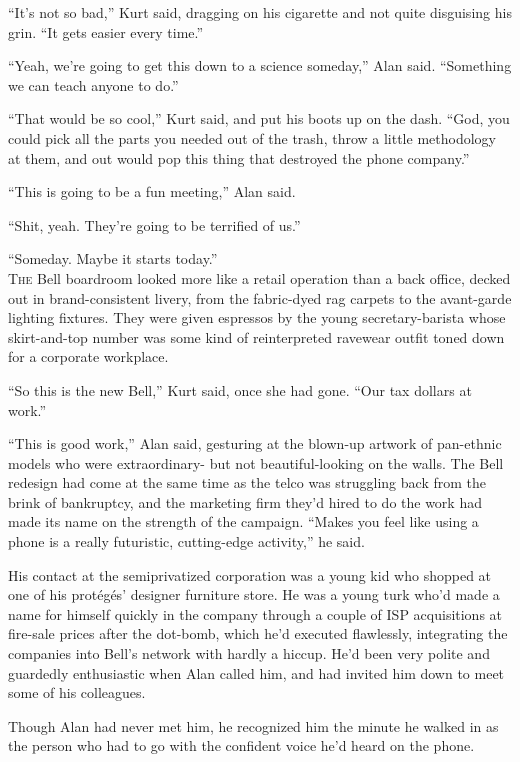 ``It's not so bad,'' Kurt said, dragging on his cigarette and not
quite disguising his grin.  ``It gets easier every time.''

``Yeah, we're going to get this down to a science someday,'' Alan
said.  ``Something we can teach anyone to do.''

``That would be so cool,'' Kurt said, and put his boots up on the
dash.  ``God, you could pick all the parts you needed out of the
trash, throw a little methodology at them, and out would pop this
thing that destroyed the phone company.''

``This is going to be a fun meeting,'' Alan said.

``Shit, yeah.  They're going to be terrified of us.''

``Someday.  Maybe it starts today.''
\\
\lettrine[lines=3, lhang=.5, nindent=0pt, findent=2pt]{T}{he} Bell boardroom looked more like a retail operation than a back
office, decked out in brand-consistent livery, from the fabric-dyed
rag carpets to the avant-garde lighting fixtures.  They were given
espressos by the young secretary-barista whose skirt-and-top number
was some kind of reinterpreted ravewear outfit toned down for a
corporate workplace.

``So this is the new Bell,'' Kurt said, once she had gone.  ``Our tax
dollars at work.''

``This is good work,'' Alan said, gesturing at the blown-up artwork of
pan-ethnic models who were extraordinary- but not beautiful-looking on
the walls.  The Bell redesign had come at the same time as the telco
was struggling back from the brink of bankruptcy, and the marketing
firm they'd hired to do the work had made its name on the strength of
the campaign.  ``Makes you feel like using a phone is a really
futuristic, cutting-edge activity,'' he said.

His contact at the semiprivatized corporation was a young kid who
shopped at one of his prot\'{e}g\'{e}s' designer furniture store.  He
was a young turk who'd made a name for himself quickly in the company
through a couple of ISP acquisitions at fire-sale prices after the
dot-bomb, which he'd executed flawlessly, integrating the companies
into Bell's network with hardly a hiccup.  He'd been very polite and
guardedly enthusiastic when Alan called him, and had invited him down
to meet some of his colleagues.

Though Alan had never met him, he recognized him the minute he walked
in as the person who had to go with the confident voice he'd heard on
the phone.

